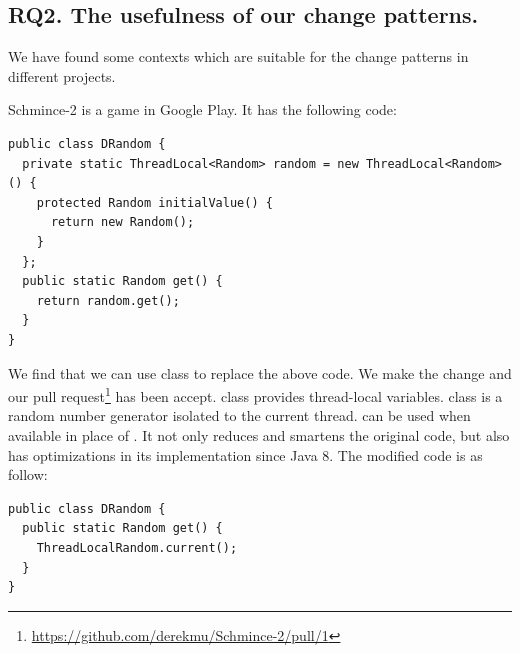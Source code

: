 %
%
%
%
%
%

\subsection{RQ2. The usefulness of our change patterns.}
\label{sec:result:sample}


We have found some contexts which are suitable for the change patterns in different projects.

Schmince-2 is a game in Google Play. It has the following code:

\begin{lstlisting}
public class DRandom {
  private static ThreadLocal<Random> random = new ThreadLocal<Random>() {
    protected Random initialValue() {
      return new Random();
    }
  };
  public static Random get() {
    return random.get();
  }
}
\end{lstlisting}

We find that we can use  class to replace the above code. We make the change and our pull request\footnote{\url{https://github.com/derekmu/Schmince-2/pull/1}} has been accept.  class provides thread-local variables.  class is a random number generator isolated to the current thread.  can be used when available in place of . It not only reduces and smartens the original code, but also has optimizations in its implementation since Java 8. The modified code is as follow:

\begin{lstlisting}
public class DRandom {
  public static Random get() {
    ThreadLocalRandom.current();
  }
}
\end{lstlisting}


